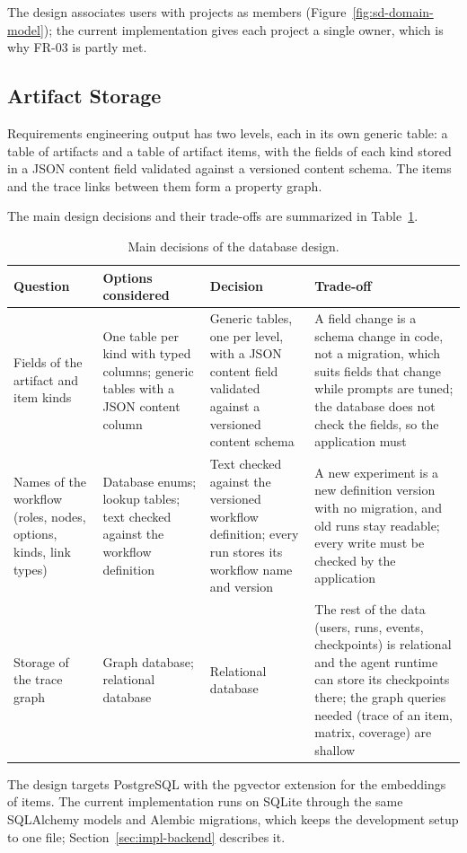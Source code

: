 The design associates users with projects as members (Figure~\ref{fig:sd-domain-model}); the current implementation gives each project a single owner, which is why FR-03 is partly met.

\subsection{Artifact Storage}
\label{sec:sd-artifact-storage}
Requirements engineering output has two levels, each in its own generic table: a table of artifacts and a table of artifact items, with the fields of each kind stored in a JSON content field validated against a versioned content schema. The items and the trace links between them form a property graph.

The main design decisions and their trade-offs are summarized in Table~\ref{tab:sd-db-decisions}.

\begin{table}[H]
    \centering
    \caption{Main decisions of the database design.}
    \label{tab:sd-db-decisions}
    \begin{tabularx}{\linewidth}{|p{2.6cm}|X|X|X|}
        \hline
        \textbf{Question} & \textbf{Options considered} & \textbf{Decision} & \textbf{Trade-off} \\
        \hline
        Fields of the artifact and item kinds & One table per kind with typed columns; generic tables with a JSON content column & Generic tables, one per level, with a JSON content field validated against a versioned content schema & A field change is a schema change in code, not a migration, which suits fields that change while prompts are tuned; the database does not check the fields, so the application must \\
        \hline
        Names of the workflow (roles, nodes, options, kinds, link types) & Database enums; lookup tables; text checked against the workflow definition & Text checked against the versioned workflow definition; every run stores its workflow name and version & A new experiment is a new definition version with no migration, and old runs stay readable; every write must be checked by the application \\
        \hline
        Storage of the trace graph & Graph database; relational database & Relational database & The rest of the data (users, runs, events, checkpoints) is relational and the agent runtime can store its checkpoints there; the graph queries needed (trace of an item, matrix, coverage) are shallow \\
        \hline
    \end{tabularx}
\end{table}

The design targets PostgreSQL with the pgvector extension for the embeddings of items. The current implementation runs on SQLite through the same SQLAlchemy models and Alembic migrations, which keeps the development setup to one file; Section~\ref{sec:impl-backend} describes it.

